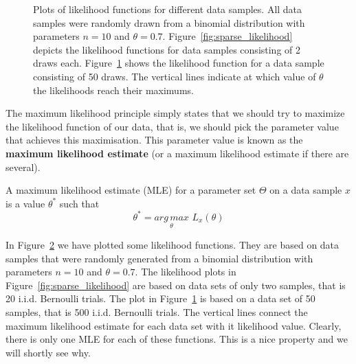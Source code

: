 \begin{figure}
\begin{subfigure}{\textwidth}
\caption{}
\label{fig:dense_likelihood} 
\end{subfigure}
\caption{Plots of likelihood functions for different data samples. All data samples were randomly drawn
from a binomial distribution with parameters $ n=10 $ and $ \theta=0.7 $. Figure~\ref{fig:sparse_likelihood}
depicts the likelihood functions for data samples consisting of 2 draws each. 
Figure~\ref{fig:dense_likelihood}
shows the likelihood function for a data sample consisting of 50 draws. The vertical lines indicate
at which value of $ \theta $ the likelihoods reach their maximums.}
\label{fig:likelihood_plots}
\end{figure}

The maximum likelihood principle simply states that we should try to maximize the likelihood function of
our data, that is, we should pick the parameter value that achieves this maximisation. This parameter value
is known as the \textbf{maximum likelihood estimate} (or a maximum likelihood estimate if there are several). 

\begin{Definition}
A maximum likelihood estimate (MLE) for a parameter set $ \Theta $ on a data sample $ x $ 
is a value $ \theta^{*} $ such that
$$ \theta^{*} = \underset{\theta}{arg\,max}\, \, L_{x}(\theta) $$
\end{Definition}

In Figure~\ref{fig:likelihood_plots} we have plotted some likelihood functions. They are based on data
samples that were randomly generated from a binomial distribution with parameters $ n=10 $ and 
$ \theta=0.7 $. The likelihood plots in Figure~\ref{fig:sparse_likelihood} are based on data sets of only
two samples, that is 20 i.i.d. Bernoulli trials. The plot in Figure~\ref{fig:dense_likelihood} is based on a 
data set of 50 samples, that is 500 i.i.d. Bernoulli trials. 
The vertical lines connect the maximum likelihood estimate
for each data set with it likelihood value. Clearly, there is only one MLE for each of these functions.
This is a nice property and we will shortly see why.

